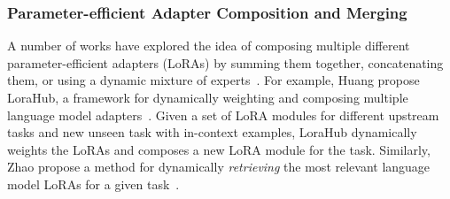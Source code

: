 \subsubsection{Parameter-efficient Adapter Composition and Merging}
A number of works have explored the idea of composing multiple different parameter-efficient adapters (\eg LoRAs) by summing them together, concatenating them, or using a dynamic mixture of experts~\cite{zhao2024merging,huang2023lorahub,xiao2024configurable,zhao2024loraretriever,yadav2024survey,wu2024mixture,gou2023mixture,li2024mixlora}.
For example, Huang \etal propose LoraHub, a framework for dynamically weighting and composing multiple language model adapters~\cite{huang2023lorahub}. Given a set of LoRA modules for different upstream tasks and new unseen task with in-context examples, LoraHub dynamically weights the LoRAs and composes a new LoRA module for the task.
Similarly, Zhao \etal propose a method for dynamically \textit{retrieving} the most relevant language model LoRAs for a given task~\cite{zhao2024loraretriever}.

